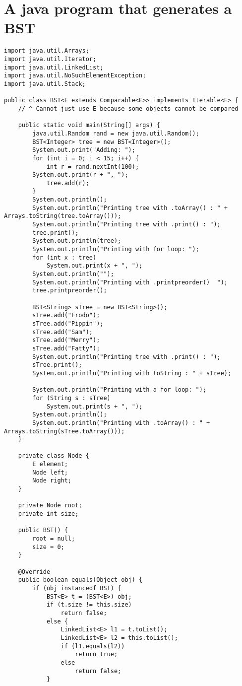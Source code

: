 \documentclass[11pt]{article}
\date{\today}
\title{}
\begin{document}
\tableofcontents

\section{A java program that generates a BST}
\label{sec:org9cd1e99}

\begin{verbatim}
import java.util.Arrays;
import java.util.Iterator;
import java.util.LinkedList;
import java.util.NoSuchElementException;
import java.util.Stack;

public class BST<E extends Comparable<E>> implements Iterable<E> {
	// ^ Cannot just use E because some objects cannot be compared

	public static void main(String[] args) {
		java.util.Random rand = new java.util.Random();
		BST<Integer> tree = new BST<Integer>();
		System.out.print("Adding: ");
		for (int i = 0; i < 15; i++) {
			int r = rand.nextInt(100);
		System.out.print(r + ", ");
			tree.add(r);
		}
		System.out.println();
		System.out.println("Printing tree with .toArray() : " + Arrays.toString(tree.toArray()));
		System.out.println("Printing tree with .print() : ");
		tree.print();
		System.out.println(tree);
		System.out.println("Printing with for loop: ");
		for (int x : tree)
			System.out.print(x + ", ");
		System.out.println("");
		System.out.println("Printing with .printpreorder()  ");
		tree.printpreorder();

		BST<String> sTree = new BST<String>();
		sTree.add("Frodo");
		sTree.add("Pippin");
		sTree.add("Sam");
		sTree.add("Merry");
		sTree.add("Fatty");
		System.out.println("Printing tree with .print() : ");
		sTree.print();
		System.out.println("Printing with toString : " + sTree);

		System.out.println("Printing with a for loop: ");
		for (String s : sTree)
			System.out.print(s + ", ");
		System.out.println();
		System.out.println("Printing with .toArray() : " + Arrays.toString(sTree.toArray()));
	}

	private class Node {
		E element;
		Node left;
		Node right;
	}

	private Node root;
	private int size;

	public BST() {
		root = null;
		size = 0;
	}

	@Override
	public boolean equals(Object obj) {
		if (obj instanceof BST) {
			BST<E> t = (BST<E>) obj;
			if (t.size != this.size)
				return false;
			else {
				LinkedList<E> l1 = t.toList();
				LinkedList<E> l2 = this.toList();
				if (l1.equals(l2))
					return true;
				else
					return false;
			}


\end{verbatim}
\end{document}
